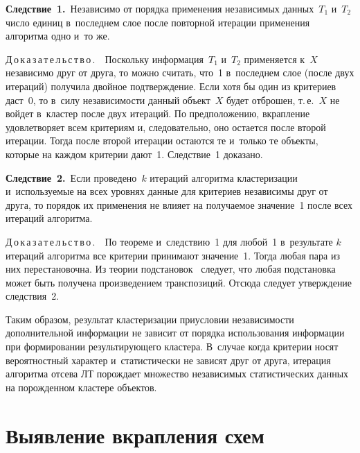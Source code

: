 \begin{multicols}{2}
  \smallskip
  
  \noindent
  \textbf{Следствие~1.}\ Независимо от порядка применения независимых 
данных~$T_1$ и~$T_2$ число единиц в~последнем слое после повторной итерации 
применения алгоритма одно и~то же.
  
  \smallskip
  
  
  \noindent
  Д\,о\,к\,а\,з\,а\,т\,е\,л\,ь\,с\,т\,в\,о\,.\ \ Поскольку информация~$T_1$ и~$T_2$ 
применяется к~$X$ независимо друг от друга, то можно считать, что~1 
в~последнем слое (после двух итераций) получила двойное подтверждение. Если 
хотя бы один из критериев даст~0, то в~силу независимости данный объект~$X$ 
будет отброшен, т.\,е.~$X$ не войдет в~кластер после двух итераций. По 
предположению, вкрапление удовлетворяет всем критериям и, следовательно, оно 
остается после второй итерации. Тогда после второй итерации остаются те 
и~только те объекты, которые на каждом критерии дают~1. Следствие~1 доказано.
  
  \smallskip
  
  \noindent
  \textbf{Следствие~2.}\ Если проведено~$k$ итераций алгоритма кластеризации и~используемые на всех уровнях данные для критериев независимы друг от друга, 
то порядок их применения не влияет на получаемое значение~1 после всех 
итераций алгоритма.
  
  \smallskip
  
  
  \noindent
  Д\,о\,к\,а\,з\,а\,т\,е\,л\,ь\,с\,т\,в\,о\,.\ \ По теореме и~следствию~1 для любой~1 
в~результате $k$ итераций алгоритма все критерии принимают значение~1. Тогда 
любая пара из них перестановочна. Из теории подстановок~\cite{15-grusho} 
следует, что любая подстановка может быть получена произведением 
транспозиций. Отсюда следует утверждение следствия~2.
  
  Таким образом, результат кластеризации при\linebreak условии независимости 
дополнительной информации не зависит от порядка использования информации 
при формировании результирующего \mbox{кластера}. В~случае когда критерии носят 
вероятностный характер и~статистически не зависят друг от друга, итерация 
алгоритма отсева ЛТ по\-рож\-да\-ет множество независимых статистических данных 
на по\-рож\-ден\-ном кластере объектов.
  
  \section{Выявление вкрапления схем}
   

\end{multicols}
